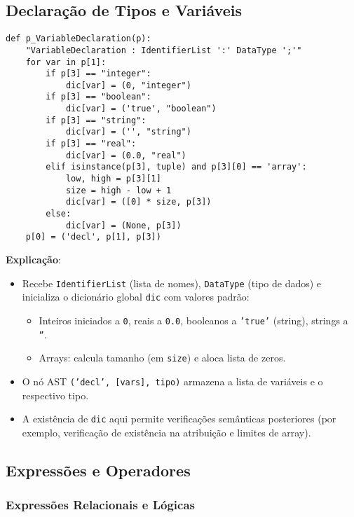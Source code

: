 \subsection{Declaração de Tipos e Variáveis}

\begin{verbatim}
def p_VariableDeclaration(p):
    "VariableDeclaration : IdentifierList ':' DataType ';'"
    for var in p[1]:
        if p[3] == "integer":
            dic[var] = (0, "integer")
        if p[3] == "boolean":
            dic[var] = ('true', "boolean")
        if p[3] == "string":
            dic[var] = ('', "string")
        if p[3] == "real":
            dic[var] = (0.0, "real")
        elif isinstance(p[3], tuple) and p[3][0] == 'array':
            low, high = p[3][1]
            size = high - low + 1
            dic[var] = ([0] * size, p[3])
        else:
            dic[var] = (None, p[3])
    p[0] = ('decl', p[1], p[3])
\end{verbatim}

\noindent

\textbf{Explicação}:
\begin{itemize}
    \item Recebe \texttt{IdentifierList} (lista de nomes), \texttt{DataType} (tipo de dados) e inicializa o dicionário global \texttt{dic} com valores padrão: 
    \begin{itemize}
        \item Inteiros iniciados a \texttt{0}, reais a \texttt{0.0}, booleanos a \texttt{'true'} (string), strings a \texttt{''}.
        \item Arrays: calcula tamanho (em \texttt{size}) e aloca lista de zeros. 
    \end{itemize}
    \item O nó AST \texttt{('decl', [vars], tipo)} armazena a lista de variáveis e o respectivo tipo.
    \item A existência de \texttt{dic} aqui permite verificações semânticas posteriores (por exemplo, verificação de existência na atribuição e limites de array).
\end{itemize}

\subsection{Expressões e Operadores}
\subsubsection{Expressões Relacionais e Lógicas}

